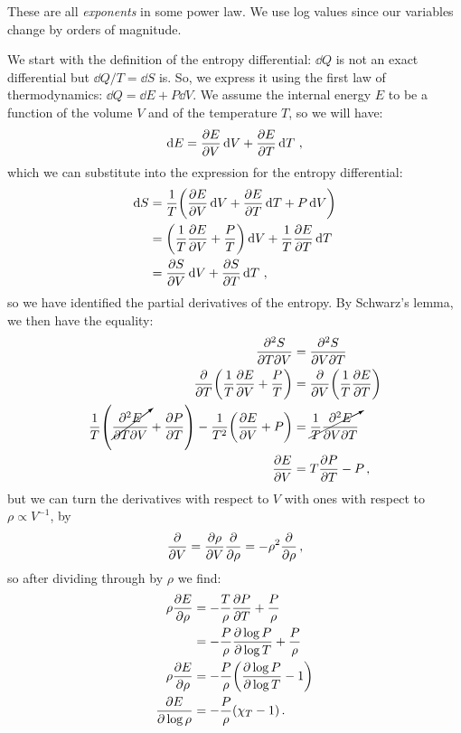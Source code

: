 \documentclass[main.tex]{subfiles}
\begin{document}
These are all \emph{exponents} in some power law.
We use log values since our variables change by orders of magnitude.

We start with  the definition of the entropy differential: \(\dd{Q}\) is not an exact differential but \(\dd{Q} / T = \dd{S}\) is. So, we express it using the first law of thermodynamics: \(\dd{Q} = \dd{E} + P \dd{V}\). 
We assume the internal energy \(E\) to be a function of the volume \(V\) and of the temperature \(T\), so we will have: 
%
\begin{align}
\dd{E} = \pdv{E}{V} \dd{V} + \pdv{E}{T} \dd{T}
\,,
\end{align}
%
which we can substitute into the expression for the entropy differential: 
%
\begin{subequations}
\begin{align}
\dd{S} &= \frac{1}{T} \qty(\pdv{E}{V} \dd{V} + \pdv{E}{T} \dd{T} + P \dd{V})  \\
&= \qty(\frac{1}{T} \pdv{E}{V} + \frac{P}{T}) \dd{V} 
+ \frac{1}{T} \pdv{E}{T} \dd{T}  \\
&= \pdv{S}{V} \dd{V} + \pdv{S}{T} \dd{T}
\,,
\end{align}
\end{subequations}
%
so we have identified the partial derivatives of the entropy. By Schwarz's lemma, we then have the equality: 
%
\begin{subequations}
\begin{align}
\pdv[2]{S}{T}{V} &= \pdv[2]{S}{V}{T}  \\
\pdv{}{T} \qty(\frac{1}{T} \pdv{E}{V} + \frac{P}{T})&=
\pdv{}{V} \qty(\frac{1}{T} \pdv{E}{T})  \\
\frac{1}{T} \qty(\cancelto{}{\pdv[2]{E}{T}{V}} + \pdv{P}{T} ) 
- \frac{1}{T^2} \qty(\pdv{E}{V} + P) &=
\cancelto{}{\frac{1}{T} \pdv[2]{E}{V}{T}}  \\
 \pdv{E}{V} &= T \pdv{P}{T} - P 
\,,
\end{align}
\end{subequations}
%
but we can turn the derivatives with respect to \(V\) with ones with respect to \(\rho \propto V^{-1}\), by 
%
\begin{align}
\pdv{}{V} = \pdv{\rho }{V} \pdv{}{\rho } = - \rho^2 \pdv{}{\rho }
\,,
\end{align}
%
so after dividing through by \(\rho \) we find: 
%
\begin{subequations}
\begin{align}
\rho \pdv{E}{\rho } &= -\frac{T}{\rho } \pdv{P}{T} + \frac{P}{\rho }  \\
&= - \frac{P}{\rho } \pdv{\log P }{\log T} + \frac{P}{\rho }  \\
\rho \pdv{E}{\rho }&= - \frac{P}{\rho } \qty(\pdv{\log P }{\log T} -1 )  \\
\pdv{E}{\log \rho }&= -\frac{P}{\rho } \qty(\chi_{T} - 1)
\,.
\end{align}
\end{subequations}
%
\end{document}
